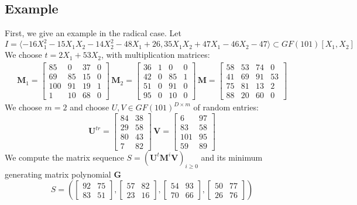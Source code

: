 \documentclass[12pt]{article}
\def\mG{\mathbf{G}}
\def\mM{\mathbf{M}}
\def\mU{\mathbf{U}}
\def\mV{\mathbf{V}}
\begin{document}
\subsection{Example}
First, we give an example in the radical case. Let
$$I = \langle -16X_1^2 - 15X_1X_2 - 14X_2^2 - 48X_1 + 26, 35X_1X_2 + 47X_1 - 46X_2 - 47 \rangle \subset GF(101)[X_1,X_2]$$
We choose $t = 2X_1 + 53 X_2$, with multiplication matrices:
\begin{align*}
\mM_1 = \begin{bmatrix}
 85&   0&  37&   0\\
 69&  85&  15&   0\\
100&  91&  19&   1\\
  1&  10&  68&   0
\end{bmatrix}\,
\mM_2 = \begin{bmatrix}
36&  1&  0&  0\\
42&  0& 85&  1\\
51&  0& 91&  0\\
95&  0& 10&  0
\end{bmatrix}\,
\mM = \begin{bmatrix}
58& 53& 74&  0\\
41& 69& 91& 53\\
75& 81& 13&  2\\
88& 20& 60&  0
\end{bmatrix}
\end{align*}
We choose $m = 2$ and choose $U,V \in GF(101)^{D\times m}$ of random
entries:
$$ \mU^{tr} = \begin{bmatrix}
84& 38\\
29& 58\\
80& 43\\
 7& 82
\end{bmatrix}\,
\mV = \begin{bmatrix}
  6&  97\\
 83&  58\\
101&  95\\
 59&  89
\end{bmatrix}
$$
We compute the matrix sequence $S = (\mU^t\mM^i\mV)_{i\ge0}$ and its minimum generating matrix polynomial $\mG$
$$ S = (
\begin{bmatrix}
92& 75\\  
83& 51
\end{bmatrix},
\begin{bmatrix}
57& 82\\  
23& 16
\end{bmatrix},
\begin{bmatrix}
54& 93\\  
70& 66
\end{bmatrix},
\begin{bmatrix}
50& 77\\
26& 76
\end{bmatrix}
)$$
\end{document}
